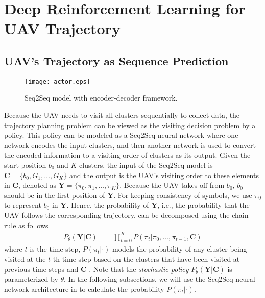 \documentclass[journal]{IEEEtran}
\begin{document}
	
	\section{Deep Reinforcement Learning for UAV Trajectory}\label{SecIV}
    \subsection{UAV's Trajectory as Sequence Prediction}

     \begin{figure*}[t]
		\centering
		\texttt{[image: actor.eps]}
		\caption{Seq2Seq model with encoder-decoder framework.}
		\label{actorstru}
	\end{figure*}
	
	Because the UAV needs to visit all clusters sequentially to collect data, the trajectory planning problem can be viewed as the visiting decision problem by a policy. This policy can be modeled as a Seq2Seq neural network where one network encodes the input clusters, and then another network is used to convert the encoded information to a visiting order of clusters as its output. Given the start position $b_0$ and $K$ clusters, {the input of the Seq2Seq model is} $\bm{{C}} = \{b_0,G_1, \dots, G_K\}$ and the output is the UAV's visiting order to these elements in $\bm{{C}}$, denoted as $\bm{Y} = \{\pi_0,\pi_1,\dots,\pi_K\}$. Because the UAV takes off from $b_0$, $b_0$ should be in the first position of $\bm{Y}$. For keeping consistency of symbols, we use $\pi_0$ to represent $b_0$ in $\bm{Y}$. Hence, the probability of $\bm{Y}$, i.e., the probability that the UAV follows the corresponding trajectory, can be decomposed using the chain rule as follows
    \begin{equation}
    \begin{aligned}
    \label{chainrule}
        P_\theta(\bm{Y}|\bm{C}) & = \prod_{t=0}^{K}P(\pi_t|\pi_0,\dots,\pi_{t-1}, \bm{C})
    \end{aligned}
    \end{equation}
	where $t$ is the time step, $P(\pi_t|\cdot)$ models the probability of any cluster being visited at the $t$-th time step based on the clusters that have been visited at previous time steps and $\bm{C}$ \cite{I. Bello etc.}. Note that the \emph{stochastic policy} $P_\theta(\bm{Y}|\bm{C})$ is parameterized by $\theta$. In the following subsections, we will use the Seq2Seq neural network architecture in \cite{M. Nazari} to calculate the probability $P(\pi_t|\cdot)$.
\end{document}
